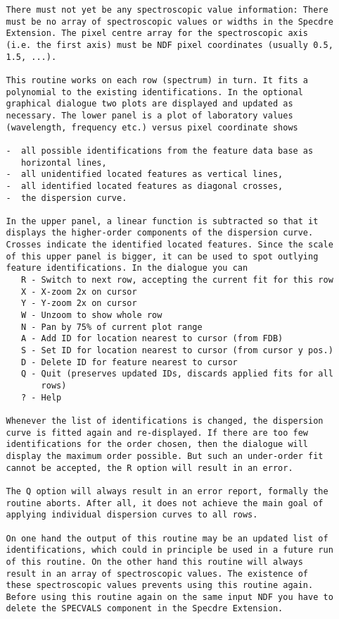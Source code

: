 \begin{description}
\begin{verbatim}
   There must not yet be any spectroscopic value information: There
   must be no array of spectroscopic values or widths in the Specdre
   Extension. The pixel centre array for the spectroscopic axis
   (i.e. the first axis) must be NDF pixel coordinates (usually 0.5,
   1.5, ...).

   This routine works on each row (spectrum) in turn. It fits a
   polynomial to the existing identifications. In the optional
   graphical dialogue two plots are displayed and updated as
   necessary. The lower panel is a plot of laboratory values
   (wavelength, frequency etc.) versus pixel coordinate shows

   -  all possible identifications from the feature data base as
      horizontal lines,
   -  all unidentified located features as vertical lines,
   -  all identified located features as diagonal crosses,
   -  the dispersion curve.

   In the upper panel, a linear function is subtracted so that it
   displays the higher-order components of the dispersion curve.
   Crosses indicate the identified located features. Since the scale
   of this upper panel is bigger, it can be used to spot outlying
   feature identifications. In the dialogue you can
      R - Switch to next row, accepting the current fit for this row
      X - X-zoom 2x on cursor
      Y - Y-zoom 2x on cursor
      W - Unzoom to show whole row
      N - Pan by 75% of current plot range
      A - Add ID for location nearest to cursor (from FDB)
      S - Set ID for location nearest to cursor (from cursor y pos.)
      D - Delete ID for feature nearest to cursor
      Q - Quit (preserves updated IDs, discards applied fits for all
          rows)
      ? - Help

   Whenever the list of identifications is changed, the dispersion
   curve is fitted again and re-displayed. If there are too few
   identifications for the order chosen, then the dialogue will
   display the maximum order possible. But such an under-order fit
   cannot be accepted, the R option will result in an error.

   The Q option will always result in an error report, formally the
   routine aborts. After all, it does not achieve the main goal of
   applying individual dispersion curves to all rows.

   On one hand the output of this routine may be an updated list of
   identifications, which could in principle be used in a future run
   of this routine. On the other hand this routine will always
   result in an array of spectroscopic values. The existence of
   these spectroscopic values prevents using this routine again.
   Before using this routine again on the same input NDF you have to
   delete the SPECVALS component in the Specdre Extension.


\end{verbatim}
\end{description}

